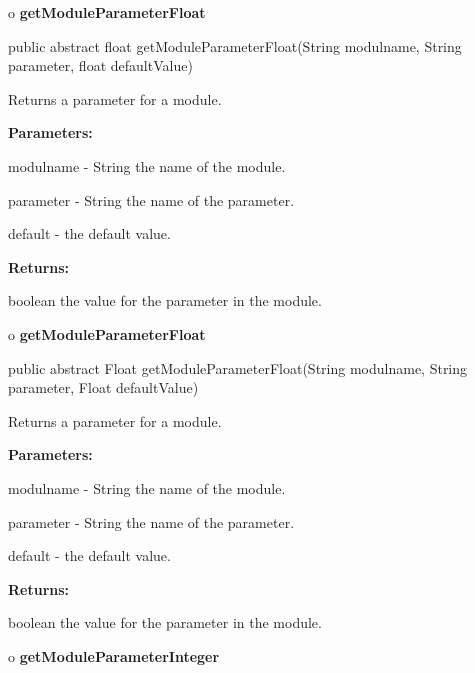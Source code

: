 o {\bf getModuleParameterFloat} 

\begin{PRE}
 public abstract float getModuleParameterFloat(String modulname,
                                               String parameter,
                                               float defaultValue)
\end{PRE}

\begin{description}
\htmlDD Returns a parameter for a module. 

\begin{description}
\item {\bf Parameters:}  

modulname - String the name of the module.  

parameter - String the name of the parameter.  

default - the default value.  
\item {\bf Returns:}  

boolean the value for the parameter in the module.  
\end{description}

\end{description}

o {\bf getModuleParameterFloat} 

\begin{PRE}
 public abstract Float getModuleParameterFloat(String modulname,
                                               String parameter,
                                               Float defaultValue)
\end{PRE}

\begin{description}
\htmlDD Returns a parameter for a module. 

\begin{description}
\item {\bf Parameters:}  

modulname - String the name of the module.  

parameter - String the name of the parameter.  

default - the default value.  
\item {\bf Returns:}  

boolean the value for the parameter in the module.  
\end{description}

\end{description}

o {\bf getModuleParameterInteger} 

